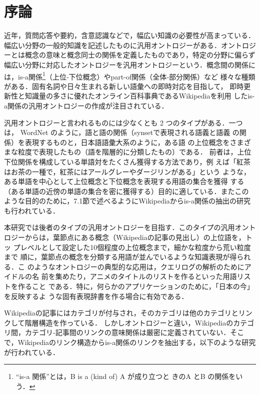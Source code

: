 \documentclass[japanese]{jnlp_1.4}
\begin{document}
\maketitle


\section{序論}

近年，質問応答や要約，含意認識などで，幅広い知識の必要性が高まっている．
幅広い分野の一般的知識を記述したものに汎用オントロジーがある．オントロジ
ーとは概念の意味と概念同士の関係を定義したものであり，特定の分野に偏らず
幅広い分野に対応したオントロジーを汎用オントロジーという．概念間の関係に
は，is-a関係\footnote{``is-a 関係''とは，B is a (kind of) A が成り立つと
きのA とB の関係をいう．}（上位‐下位概念）やpart-of関係（全体‐部分関係）など
様々な種類がある．固有名詞や日々生まれる新しい語彙への即時対応を目指して，
即時更新性と知識量の多さに優れたオンライン百科事典であるWikipediaを利用
したis-a関係の汎用オントロジーの作成が注目されている\cite{Morita}．

汎用オントロジーと言われるものには少なくとも 2 つのタイプがある．一つは，
WordNet \cite{WordNet}のように，語と語の関係（synsetで表現される語義と語義
の関係）を表現するものと，日本語語彙大系\cite{goitaikei}のように，ある語
の上位概念をさまざまな粒度で表現したもの（語を階層的に分類したもの）である．
前者は，上位下位関係を構成している単語対をたくさん獲得する方法であり，例
えば「紅茶はお茶の一種で，紅茶にはアールグレーやダージリンがある」という
ような，ある単語を中心として上位概念と下位概念を表現する用語の集合を獲得
する（ある単語の近傍の単語の集合を密に獲得する）目的に適している．またこの
ような目的のために，7.1節で述べるようにWikipediaからis-a関係の抽出の研究
も行われている．

本研究では後者のタイプの汎用オントロジーを目指す．このタイプの汎用オント
ロジーからは，葉節点にある概念（Wikipediaの記事の見出し）の上位語を，トッ
プレベルとして設定した10個程度の上位概念まで，細かな粒度から荒い粒度まで
順に，葉節点の概念を分類する用語が並んでいるような知識表現が得られる．こ
のようなオントロジーの典型的な応用は，クエリログの解析のためにアイドルの名
前を集めたり，アニメのタイトルのリストを作るといった用語リストを作ること
である．特に，何らかのアプリケーションのために，「日本の今」を反映するよ
うな固有表現辞書を作る場合に有効である．

Wikipediaの記事にはカテゴリが付与され，そのカテゴリは他のカテゴリとリンクして階層構造を作っている．
しかしオントロジーと違い，Wikipediaのカテゴリ間，カテゴリ‐記事間のリンクの意味関係は厳密に定義されていない．そこで，Wikipediaのリンク構造からis-a関係のリンクを抽出する，以下のような研究が行われている．
\end{document}
